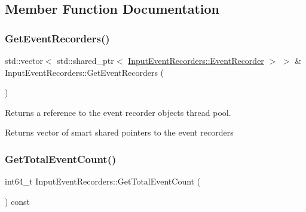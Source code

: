 \subsection{Member Function Documentation}
\mbox{\label{classEventDetect_1_1InputEventRecorders_a33322b5f96196ac7cad264428d04aeda}} 
\subsubsection{\texorpdfstring{Get\+Event\+Recorders()}{GetEventRecorders()}}
{\footnotesize\ttfamily std\+::vector$<$ std\+::shared\+\_\+ptr$<$ \mbox{\hyperlink{classEventDetect_1_1InputEventRecorders_1_1EventRecorder}{Input\+Event\+Recorders\+::\+Event\+Recorder}} $>$ $>$ \& Input\+Event\+Recorders\+::\+Get\+Event\+Recorders (\begin{DoxyParamCaption}{ }\end{DoxyParamCaption})}



Returns a reference to the event recorder objects thread pool. 

\begin{DoxyReturn}{Returns}
vector of smart shared pointers to the event recorders 
\end{DoxyReturn}
\mbox{\label{classEventDetect_1_1InputEventRecorders_aafd4194710ca37dee2cb8bd4cc5e50b0}} 
\subsubsection{\texorpdfstring{Get\+Total\+Event\+Count()}{GetTotalEventCount()}}
{\footnotesize\ttfamily int64\+\_\+t Input\+Event\+Recorders\+::\+Get\+Total\+Event\+Count (\begin{DoxyParamCaption}{ }\end{DoxyParamCaption}) const}



